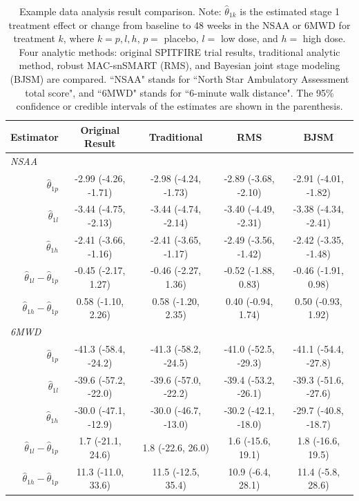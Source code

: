 \begin{table} 
\caption{\label{tab:comp} Example data analysis result comparison. Note: $\widehat{\theta}_{1k}$ is the estimated stage 1 treatment effect or change from baseline to 48 weeks in the NSAA or 6MWD for treatment $k$, where $k = p,l,h$, $p = $ placebo, $l = $ low dose, and $h = $ high dose. Four analytic methods: original SPITFIRE trial results, traditional analytic method, robust MAC-snSMART (RMS), and  Bayesian joint stage modeling (BJSM) are compared. ``NSAA" stands for ``North Star Ambulatory Assessment total score", and ``6MWD" stands for ``6-minute walk distance". The 95\% confidence or credible intervals of the estimates are shown in the parenthesis.}
\centering
\begin{tabular}{ccccc}
\hline
Estimator &  Original Result &  Traditional &  RMS  & BJSM \tabularnewline
\hline
\multicolumn{1}{l}{\textit{NSAA}} &&&&\\
\multicolumn{1}{r}{$\widehat{\theta}_{1p}$} &  -2.99 (-4.26, -1.71) &  -2.98 (-4.24, -1.73) &  -2.89 (-3.68, -2.10) &  -2.91 (-4.01, -1.82)  \tabularnewline 

\multicolumn{1}{r}{$\widehat{\theta}_{1l}$}  &  -3.44 (-4.75, -2.13) &  -3.44 (-4.74, -2.14) &  -3.40 (-4.49, -2.31) &  -3.38 (-4.34, -2.41)  \tabularnewline

\multicolumn{1}{r}{$\widehat{\theta}_{1h}$} &  -2.41 (-3.66, -1.16) &  -2.41 (-3.65, -1.17)  &  -2.49 (-3.56, -1.42) &   -2.42 (-3.35, -1.48) \tabularnewline

\multicolumn{1}{r}{$\widehat{\theta}_{1l} - \widehat{\theta}_{1p}$} &  -0.45 (-2.17, 1.27) &  -0.46 (-2.27, 1.36)  &  -0.52 (-1.88, 0.83) &  -0.46 (-1.91, 0.98)  \tabularnewline
\multicolumn{1}{r}{$\widehat{\theta}_{1h} - \widehat{\theta}_{1p}$} &  	0.58 (-1.10, 2.26) &  0.58 (-1.20, 2.35)  &  0.40 (-0.94, 1.74) &  0.50 (-0.93, 1.92)\tabularnewline
\hline
\multicolumn{1}{l}{\textit{6MWD}} &&&&\\
\multicolumn{1}{r}{$\widehat{\theta}_{1p}$} &  -41.3 (-58.4, -24.2) &  -41.3 (-58.2, -24.5)  &  -41.0 (-52.5, -29.3) &  -41.1 (-54.4, -27.8) \tabularnewline 

\multicolumn{1}{r}{$\widehat{\theta}_{1l}$} &  -39.6 (-57.2, -22.0) &  -39.6 (-57.0, -22.2)  &  -39.4 (-53.2, -26.1) &  -39.3 (-51.6, -27.6) \tabularnewline

\multicolumn{1}{r}{$\widehat{\theta}_{1h}$} &  -30.0 (-47.1, -12.9) &  -30.0 (-46.7, -13.0)  &  -30.2 (-42.1, -18.0) &   -29.7 (-40.8, -18.7)\tabularnewline

\multicolumn{1}{r}{$\widehat{\theta}_{1l} - \widehat{\theta}_{1p}$} &  1.7 (-21.1, 24.6) &  1.8 (-22.6, 26.0)  &  1.6 (-15.6, 19.1) &  1.8 (-16.6, 19.5)   \tabularnewline
\multicolumn{1}{r}{$\widehat{\theta}_{1h} - \widehat{\theta}_{1p}$} &  11.3 (-11.0, 33.6) &  11.5 (-12.5, 35.4)  &  10.9 (-6.4, 28.1) &  11.4 (-5.8, 28.6) \tabularnewline
\hline
\end{tabular}
\end{table}

